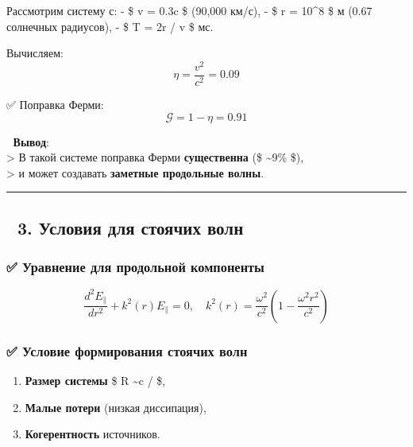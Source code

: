 \documentclass[11pt]{article}
\providecommand{\tightlist}{%
      \setlength{\itemsep}{0pt}\setlength{\parskip}{0pt}}
\begin{document}
Рассмотрим систему с: - \$ v = 0.3c \$ (90,000 км/с), - \$ r = 10\^{}8
\$ м (0.67 солнечных радиусов), - \$ T = 2\pi r / v  \$ мс.

Вычисляем: \[
\eta = \frac{v^2}{c^2} = 0.09
\]

✅ Поправка Ферми: \[
\mathcal{G} = 1 - \eta = 0.91
\]

📌 \textbf{Вывод}:\\
\textgreater{} В такой системе поправка Ферми \textbf{существенна} (\$
\sim 9\% \$),\\
\textgreater{} и может создавать \textbf{заметные продольные волны}.

\begin{center}\rule{0.5\linewidth}{\linethickness}\end{center}

\subsection{🔹 3. Условия для стоячих
волн}\label{ux443ux441ux43bux43eux432ux438ux44f-ux434ux43bux44f-ux441ux442ux43eux44fux447ux438ux445-ux432ux43eux43bux43d}

\subsubsection{✅ Уравнение для продольной
компоненты}\label{ux443ux440ux430ux432ux43dux435ux43dux438ux435-ux434ux43bux44f-ux43fux440ux43eux434ux43eux43bux44cux43dux43eux439-ux43aux43eux43cux43fux43eux43dux435ux43dux442ux44b-1}

\[
\frac{d^2 E_{\parallel}}{dr^2} + k^2(r) E_{\parallel} = 0, \quad k^2(r) = \frac{\omega^2}{c^2} \left( 1 - \frac{\omega^2 r^2}{c^2} \right)
\]

\subsubsection{✅ Условие формирования стоячих
волн}\label{ux443ux441ux43bux43eux432ux438ux435-ux444ux43eux440ux43cux438ux440ux43eux432ux430ux43dux438ux44f-ux441ux442ux43eux44fux447ux438ux445-ux432ux43eux43bux43d}

\begin{enumerate}
\def\labelenumi{\arabic{enumi}.}
\tightlist
\item
  \textbf{Размер системы} \$ R \sim c / \omega \$,
\item
  \textbf{Малые потери} (низкая диссипация),
\item
  \textbf{Когерентность} источников.
\end{enumerate}
\end{document}
